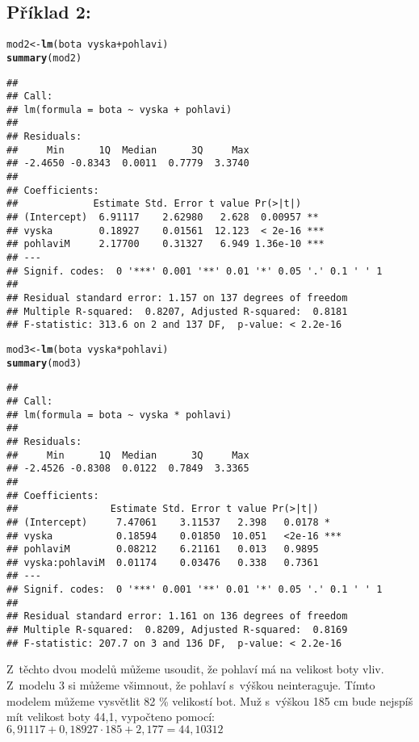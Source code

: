 \documentclass[twoside]{article}\usepackage[]{graphicx}\usepackage[]{color}
\makeatletter
\newcommand{\hlopt}[1]{\textcolor[rgb]{0,0,0}{#1}}%
\newcommand{\hlstd}[1]{\textcolor[rgb]{0.345,0.345,0.345}{#1}}%
\newcommand{\hlkwb}[1]{\textcolor[rgb]{0.69,0.353,0.396}{#1}}%
\newcommand{\hlkwd}[1]{\textcolor[rgb]{0.737,0.353,0.396}{\textbf{#1}}}%
\newenvironment{kframe}{%
 \def\at@end@of@kframe{}%
 \ifinner\ifhmode%
  \def\at@end@of@kframe{\end{minipage}}%
  \begin{minipage}{\columnwidth}%
 \fi\fi%
 \def\FrameCommand##1{\hskip\@totalleftmargin \hskip-\fboxsep
 \colorbox{shadecolor}{##1}\hskip-\fboxsep
     \hskip-\linewidth \hskip-\@totalleftmargin \hskip\columnwidth}%
 \MakeFramed {\advance\hsize-\width
   \@totalleftmargin\z@ \linewidth\hsize
   \@setminipage}}%
 {\par\unskip\endMakeFramed%
 \at@end@of@kframe}
\newenvironment{knitrout}{}{} %
\makeatother
\begin{document}
\subsection*{Příklad 2:}
\begin{knitrout}
\color{fgcolor}\begin{kframe}
\begin{alltt}
\hlstd{mod2} \hlkwb{<-} \hlkwd{lm}\hlstd{(bota}\hlopt{~}\hlstd{vyska} \hlopt{+} \hlstd{pohlavi)}
\hlkwd{summary}\hlstd{(mod2)}
\end{alltt}
\begin{verbatim}
## 
## Call:
## lm(formula = bota ~ vyska + pohlavi)
## 
## Residuals:
##     Min      1Q  Median      3Q     Max 
## -2.4650 -0.8343  0.0011  0.7779  3.3740 
## 
## Coefficients:
##             Estimate Std. Error t value Pr(>|t|)    
## (Intercept)  6.91117    2.62980   2.628  0.00957 ** 
## vyska        0.18927    0.01561  12.123  < 2e-16 ***
## pohlaviM     2.17700    0.31327   6.949 1.36e-10 ***
## ---
## Signif. codes:  0 '***' 0.001 '**' 0.01 '*' 0.05 '.' 0.1 ' ' 1
## 
## Residual standard error: 1.157 on 137 degrees of freedom
## Multiple R-squared:  0.8207,	Adjusted R-squared:  0.8181 
## F-statistic: 313.6 on 2 and 137 DF,  p-value: < 2.2e-16
\end{verbatim}
\begin{alltt}
\hlstd{mod3} \hlkwb{<-} \hlkwd{lm}\hlstd{(bota}\hlopt{~}\hlstd{vyska} \hlopt{*} \hlstd{pohlavi)}
\hlkwd{summary}\hlstd{(mod3)}
\end{alltt}
\begin{verbatim}
## 
## Call:
## lm(formula = bota ~ vyska * pohlavi)
## 
## Residuals:
##     Min      1Q  Median      3Q     Max 
## -2.4526 -0.8308  0.0122  0.7849  3.3365 
## 
## Coefficients:
##                Estimate Std. Error t value Pr(>|t|)    
## (Intercept)     7.47061    3.11537   2.398   0.0178 *  
## vyska           0.18594    0.01850  10.051   <2e-16 ***
## pohlaviM        0.08212    6.21161   0.013   0.9895    
## vyska:pohlaviM  0.01174    0.03476   0.338   0.7361    
## ---
## Signif. codes:  0 '***' 0.001 '**' 0.01 '*' 0.05 '.' 0.1 ' ' 1
## 
## Residual standard error: 1.161 on 136 degrees of freedom
## Multiple R-squared:  0.8209,	Adjusted R-squared:  0.8169 
## F-statistic: 207.7 on 3 and 136 DF,  p-value: < 2.2e-16
\end{verbatim}
\end{kframe}
\end{knitrout}
Z~těchto dvou modelů můžeme usoudit, že pohlaví má na velikost boty vliv. Z~modelu 3 si můžeme všimnout, že pohlaví s~výškou neinteraguje. Tímto modelem můžeme vysvětlit 82 \% velikostí bot. Muž s~výškou 185 cm bude nejspíš mít velikost boty 44,1, vypočteno pomocí: ${6,91117 + 0,18927 \cdot 185 + 2,177 = 44,10312}$
\end{document}
